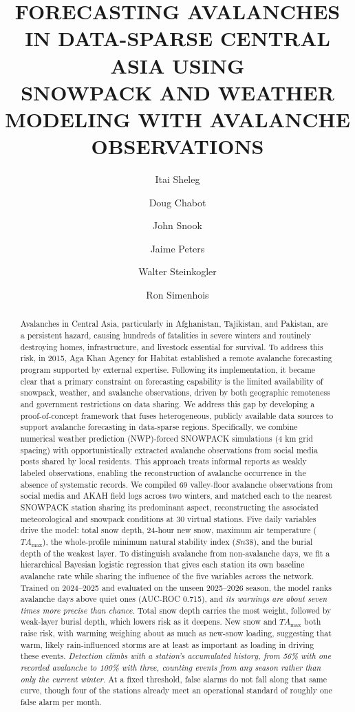 \documentclass{issw}
\title{FORECASTING AVALANCHES IN DATA-SPARSE CENTRAL ASIA USING \\
SNOWPACK AND WEATHER MODELING WITH AVALANCHE OBSERVATIONS}
\author[1]{Itai Sheleg\corref{complete\_address}}
\author[2]{Doug Chabot}
\author[3]{John Snook}
\author[1]{Jaime Peters}
\author[4]{Walter Steinkogler}
\author[3]{Ron Simenhois}
\newcommand{\TAmax}{TA_{\mathrm{max}}}
\begin{document}
\pagestyle{empty}

\begin{abstract}
Avalanches in Central Asia, particularly in Afghanistan, Tajikistan, and Pakistan, are a persistent hazard, causing hundreds of fatalities in severe winters and routinely destroying homes, infrastructure, and livestock essential for survival. To address this risk, in 2015, Aga Khan Agency for Habitat established a remote avalanche forecasting program supported by external expertise.
Following its implementation, it became clear that a primary constraint on forecasting capability is the limited availability of snowpack, weather, and avalanche observations, driven by both geographic remoteness and government restrictions on data sharing.
We address this gap by developing a proof-of-concept framework that fuses heterogeneous, publicly available data sources to support avalanche forecasting in data-sparse regions. Specifically, we combine numerical weather prediction (NWP)-forced SNOWPACK simulations (4 km grid spacing) with opportunistically extracted avalanche observations from social media posts shared by local residents. This approach treats informal reports as weakly labeled observations, enabling the reconstruction of avalanche occurrence in the absence of systematic records.
We compiled 69 valley-floor avalanche observations from social media and AKAH field logs across two winters, and matched each to the nearest SNOWPACK station sharing its predominant aspect, reconstructing the associated meteorological and snowpack conditions at 30 virtual stations. Five daily variables drive the model: total snow depth, 24-hour new snow, maximum air temperature ($\TAmax$), the whole-profile minimum natural stability index ($Sn38$), and the burial depth of the weakest layer. To distinguish avalanche from non-avalanche days, we fit a hierarchical Bayesian logistic regression that gives each station its own baseline avalanche rate while sharing the influence of the five variables across the network.
Trained on 2024–2025 and evaluated on the unseen 2025–2026 season, the model ranks avalanche days above quiet ones (AUC-ROC 0.715), and \textit{its warnings are about seven times more precise than chance.} Total snow depth carries the most weight, followed by weak-layer burial depth, which lowers risk as it deepens. New snow and $\TAmax$ both raise risk, with warming weighing about as much as new-snow loading, suggesting that warm, likely rain-influenced storms are at least as important as loading in driving these events. \textit{Detection climbs with a station's accumulated history, from 56\% with one recorded avalanche to 100\% with three, counting events from any season rather than only the current winter.} At a fixed threshold, false alarms do not fall along that same curve, though four of the stations already meet an operational standard of roughly one false alarm per month.

\end{abstract}
\end{document}
